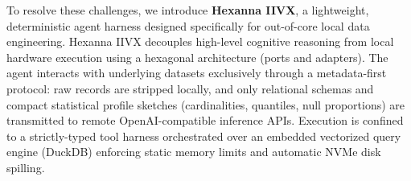 \begin{table}[htbp]
\centering
\small
\caption{Architectural comparison of local data engineering paradigms.}
\label{tab:agent_comparison}
\end{table}

To resolve these challenges, we introduce \textbf{Hexanna IIVX}, a lightweight, deterministic agent harness designed specifically for out-of-core local data engineering. Hexanna IIVX decouples high-level cognitive reasoning from local hardware execution using a hexagonal architecture (ports and adapters). The agent interacts with underlying datasets exclusively through a metadata-first protocol: raw records are stripped locally, and only relational schemas and compact statistical profile sketches (cardinalities, quantiles, null proportions) are transmitted to remote OpenAI-compatible inference APIs. Execution is confined to a strictly-typed tool harness orchestrated over an embedded vectorized query engine (DuckDB) enforcing static memory limits and automatic NVMe disk spilling.


